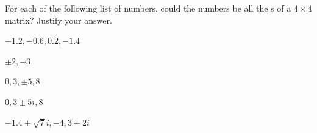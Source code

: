 \begin{exercise} \label{ex:} 
For each of the following list of numbers, could the numbers be all the s of a \(4\times4\) matrix? 
Justify your answer.
\begin{parts}
\item \(-1.2,-0.6,0.2,-1.4\)

\item \(\pm2,-3\)

\item \(0,3,\pm5,8\)

\item \(0,3\pm5i,8\)

\item \(-1.4\pm\sqrt7i,-4,3\pm2i\)

\end{parts}
\end{exercise}






